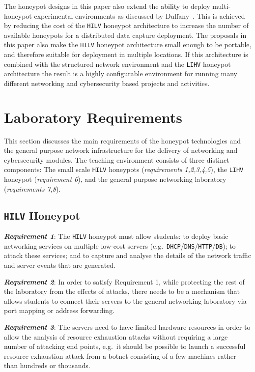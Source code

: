 \documentclass{ieeeaccess}
\begin{document}
The honeypot designs in this paper also extend the ability to deploy
multi-honeypot experimental environments as discussed by Duffany~\cite{JD:08}.
This is achieved by reducing the cost of the \texttt{HILV} honeypot
architecture to increase the number of available honeypots for a distributed
data capture deployment. The proposals in this paper also make the
\texttt{HILV} honeypot architecture small enough to be portable, and therefore
suitable for deployment in multiple locations. If this architecture is combined
with the structured network environment and the \texttt{LIHV} honeypot
architecture the result is a highly configurable environment for running many
different networking and cybersecurity based projects and activities.

\section{Laboratory Requirements}\label{sec:TeachingRequire}

This section discusses the main requirements of the honeypot technologies and
the general purpose network infrastructure for the delivery of networking and
cybersecurity modules. The teaching environment consists of three distinct
components: The small scale \texttt{HILV} honeypots (\textit{requirements
1,2,3,4,5}), the \texttt{LIHV} honeypot (\textit{requirement 6}), and the
general purpose networking laboratory (\textit{requirements 7,8}).

\subsection{\texttt{HILV} Honeypot}\label{subsec:ResearchHoneypot}

\noindent\textit{\textbf{Requirement 1}}:
The \texttt{HILV} honeypot must allow students: to deploy basic networking services
on multiple low-cost servers
(e.g.\ \texttt{DHCP}/\texttt{DNS}/\texttt{HTTP}/\texttt{DB}); to attack these
services; and to capture and analyse the details of the network traffic
and server events that are generated.

\noindent\textit{\textbf{Requirement 2}}:
In order to satisfy Requirement 1, while protecting the rest of the laboratory
from the effects of attacks, there needs to be a mechanism that allows students
to connect their servers to the general networking laboratory via port mapping
or address forwarding.

\noindent\textit{\textbf{Requirement 3}}:
The servers need to have limited hardware resources in order to allow the
analysis of resource exhaustion attacks without requiring a large number of
attacking end points, e.g.\ it should be possible to launch a successful
resource exhaustion attack from a botnet consisting of a few machines rather
than hundreds or thousands.
\end{document}
